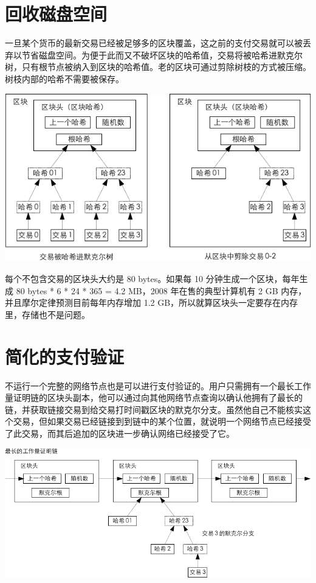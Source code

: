 \documentclass{article}
\begin{document}
\section{回收磁盘空间}
一旦某个货币的最新交易已经被足够多的区块覆盖，这之前的支付交易就可以被丢弃以节省磁盘空间。为便于此而又不破坏区块的哈希值，交易将被哈希进默克尔树\cite{Merkle}\cite{Massias}\cite{Stornetta}，只有根节点被纳入到区块的哈希值。老的区块可通过剪除树枝的方式被压缩。树枝内部的哈希不需要被保存。

\begin{center}
 \includegraphics{bitcoin-zh-cn-4}
\end{center}

每个不包含交易的区块头大约是 80 bytes。如果每 10 分钟生成一个区块，每年生成 80 bytes * 6 * 24 * 365 = 4.2 MB，2008 年在售的典型计算机有 2 GB 内存，并且摩尔定律预测目前每年内存增加 1.2 GB，所以就算区块头一定要存在内存里，存储也不是问题。

\section{简化的支付验证}
不运行一个完整的网络节点也是可以进行支付验证的。用户只需拥有一个最长工作量证明链的区块头副本，他可以通过向其他网络节点查询以确认他拥有了最长的链，并获取链接交易到给交易打时间戳区块的默克尔分支。虽然他自己不能核实这个交易，但如果交易已经链接到到链中的某个位置，就说明一个网络节点已经接受了此交易，而其后追加的区块进一步确认网络已经接受了它。

\begin{center}
 \includegraphics{bitcoin-zh-cn-5}
\end{center}
\end{document}
